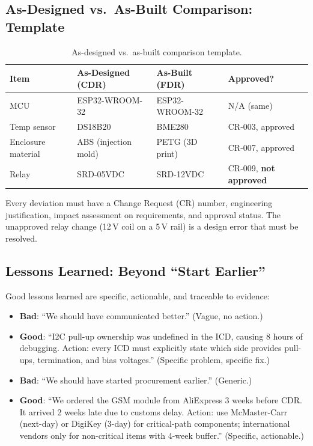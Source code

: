 \documentclass[11pt,letterpaper,twoside,openany]{book}
\begin{document}
\subsection{As-Designed vs.\ As-Built Comparison: Template}
\begin{table}[htbp]\centering\small
\begin{tabularx}{\textwidth}{l X X l}
\toprule
\textbf{Item} & \textbf{As-Designed (CDR)} & \textbf{As-Built (FDR)} & \textbf{Approved?} \\
\midrule
MCU & ESP32-WROOM-32 & ESP32-WROOM-32 & N/A (same) \\
Temp sensor & DS18B20 & BME280 & CR-003, approved \\
Enclosure material & ABS (injection mold) & PETG (3D print) & CR-007, approved \\
Relay & SRD-05VDC & SRD-12VDC & CR-009, \textbf{not approved} \\
\bottomrule
\end{tabularx}
\caption{As-designed vs.\ as-built comparison template.}
\end{table}

Every deviation must have a Change Request (CR) number, engineering justification, impact assessment on requirements, and approval status. The unapproved relay change (12\,V coil on a 5\,V rail) is a design error that must be resolved.

\subsection{Lessons Learned: Beyond ``Start Earlier''}
Good lessons learned are specific, actionable, and traceable to evidence:
\begin{itemize}[nosep,leftmargin=1.5em]
\item \textbf{Bad}: ``We should have communicated better.'' (Vague, no action.)
\item \textbf{Good}: ``I2C pull-up ownership was undefined in the ICD, causing 8 hours of debugging. Action: every ICD must explicitly state which side provides pull-ups, termination, and bias voltages.'' (Specific problem, specific fix.)
\item \textbf{Bad}: ``We should have started procurement earlier.'' (Generic.)
\item \textbf{Good}: ``We ordered the GSM module from AliExpress 3 weeks before CDR. It arrived 2 weeks late due to customs delay. Action: use McMaster-Carr (next-day) or DigiKey (3-day) for critical-path components; international vendors only for non-critical items with 4-week buffer.'' (Specific, actionable.)
\end{itemize}
\end{document}

